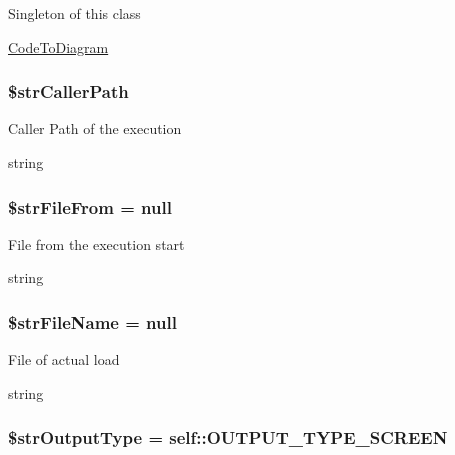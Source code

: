 Singleton of this class

\hyperlink{class_code_to_diagram}{CodeToDiagram} \hypertarget{class_code_to_diagram_80901f2e74e755896ca3914ff039dab9}{
\subsubsection[{\$strCallerPath}]{\setlength{\rightskip}{0pt plus 5cm}\$strCallerPath}}
\label{class_code_to_diagram_80901f2e74e755896ca3914ff039dab9}


Caller Path of the execution

string \hypertarget{class_code_to_diagram_b21d5fc633f2f024c72f18e4ce63555f}{
\subsubsection[{\$strFileFrom}]{\setlength{\rightskip}{0pt plus 5cm}\$strFileFrom = null}}
\label{class_code_to_diagram_b21d5fc633f2f024c72f18e4ce63555f}


File from the execution start

string \hypertarget{class_code_to_diagram_f2f34642a0d84201c7dc5604c26a5f87}{
\subsubsection[{\$strFileName}]{\setlength{\rightskip}{0pt plus 5cm}\$strFileName = null}}
\label{class_code_to_diagram_f2f34642a0d84201c7dc5604c26a5f87}


File of actual load

string \hypertarget{class_code_to_diagram_d609791f2fec4dc724795fce09b4fbb9}{
\subsubsection[{\$strOutputType}]{\setlength{\rightskip}{0pt plus 5cm}\$strOutputType = self::OUTPUT\_\-TYPE\_\-SCREEN}}
\label{class_code_to_diagram_d609791f2fec4dc724795fce09b4fbb9}


